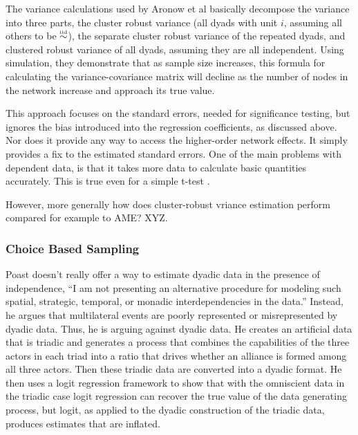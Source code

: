 The variance calculations used by Aronow et al basically decompose the variance into three parts, the cluster robust variance (all dyads with unit $i$, assuming all others to be 
$\simiid$), the separate cluster robust variance of the repeated dyads, and clustered robust variance of all dyads, assuming they are all independent.  Using simulation, they demonstrate that as sample size increases, this formula for calculating the variance-covariance matrix will decline as the number of nodes in the network increase and approach its true value.  

This approach focuses on the standard errors, needed for significance testing, but ignores the bias introduced into the regression coefficients, as discussed above.  Nor does it provide any way to access the higher-order network effects. It simply provides a fix to the estimated standard errors.  One of the main problems with dependent data, is that it takes more data to calculate basic quantities accurately. This is true even for a simple t-test \citep{ward:gleditsch:2008}. 

However, more generally how does cluster-robust vriance estimation perform compared for example to AME?  XYZ.




\subsubsection*{Choice Based Sampling}

Poast \citeyear{poast:2010,poast:2016} doesn't really offer a way to estimate dyadic data in the presence of independence,
``I am not presenting an alternative procedure for modeling such spatial, strategic, temporal,
or monadic interdependencies in the data.'' Instead, he argues that multilateral events are poorly represented or misrepresented by dyadic data.  Thus, he is arguing against dyadic data.  He creates an artificial data that is triadic and generates a process that combines the capabilities of the three actors in each triad into a ratio that drives whether an alliance is formed among all three actors.  Then these triadic data are converted into a dyadic format. He then uses a logit regression framework to show that with the omniscient data in the triadic case logit regression can recover the true value of the data generating process, but logit, as applied to the dyadic construction of the triadic data, produces estimates that are inflated. 

